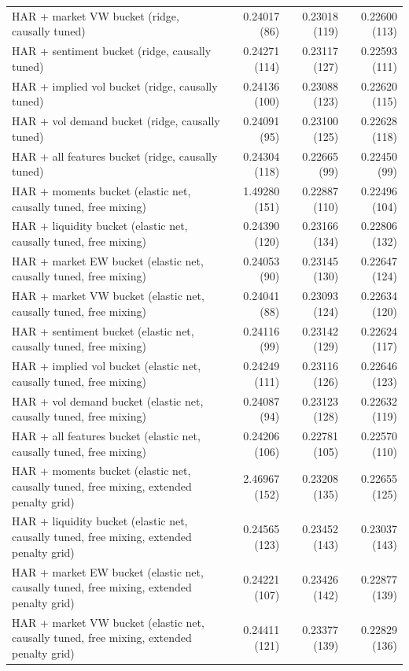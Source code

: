 \begin{longtable}{p{}rrr}
HAR + market VW bucket (ridge, causally tuned) & 0.24017 (86) & 0.23018 (119) & 0.22600 (113) \\
HAR + sentiment bucket (ridge, causally tuned) & 0.24271 (114) & 0.23117 (127) & 0.22593 (111) \\
HAR + implied vol bucket (ridge, causally tuned) & 0.24136 (100) & 0.23088 (123) & 0.22620 (115) \\
HAR + vol demand bucket (ridge, causally tuned) & 0.24091 (95) & 0.23100 (125) & 0.22628 (118) \\
HAR + all features bucket (ridge, causally tuned) & 0.24304 (118) & 0.22665 (99) & 0.22450 (99) \\
HAR + moments bucket (elastic net, causally tuned, free mixing) & 1.49280 (151) & 0.22887 (110) & 0.22496 (104) \\
HAR + liquidity bucket (elastic net, causally tuned, free mixing) & 0.24390 (120) & 0.23166 (134) & 0.22806 (132) \\
HAR + market EW bucket (elastic net, causally tuned, free mixing) & 0.24053 (90) & 0.23145 (130) & 0.22647 (124) \\
HAR + market VW bucket (elastic net, causally tuned, free mixing) & 0.24041 (88) & 0.23093 (124) & 0.22634 (120) \\
HAR + sentiment bucket (elastic net, causally tuned, free mixing) & 0.24116 (99) & 0.23142 (129) & 0.22624 (117) \\
HAR + implied vol bucket (elastic net, causally tuned, free mixing) & 0.24249 (111) & 0.23116 (126) & 0.22646 (123) \\
HAR + vol demand bucket (elastic net, causally tuned, free mixing) & 0.24087 (94) & 0.23123 (128) & 0.22632 (119) \\
HAR + all features bucket (elastic net, causally tuned, free mixing) & 0.24206 (106) & 0.22781 (105) & 0.22570 (110) \\
HAR + moments bucket (elastic net, causally tuned, free mixing, extended penalty grid) & 2.46967 (152) & 0.23208 (135) & 0.22655 (125) \\
HAR + liquidity bucket (elastic net, causally tuned, free mixing, extended penalty grid) & 0.24565 (123) & 0.23452 (143) & 0.23037 (143) \\
HAR + market EW bucket (elastic net, causally tuned, free mixing, extended penalty grid) & 0.24221 (107) & 0.23426 (142) & 0.22877 (139) \\
HAR + market VW bucket (elastic net, causally tuned, free mixing, extended penalty grid) & 0.24411 (121) & 0.23377 (139) & 0.22829 (136) \\

\end{longtable}
